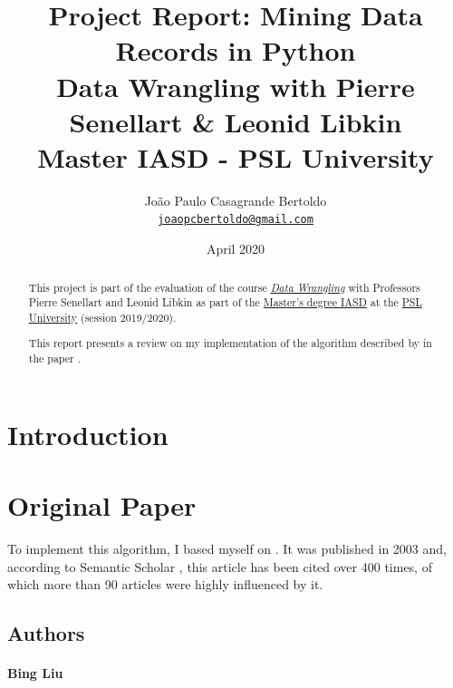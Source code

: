 \documentclass[10pt]{article}
\title{
    \huge Project Report: Mining Data Records in Python \\ 
    \medskip
    \large Data Wrangling with Pierre Senellart \& Leonid Libkin  \\
    Master IASD - PSL University
}
\author{
    João Paulo Casagrande Bertoldo \\
    \href{mailto:joaopcbertoldo@gmail.com}{\texttt{joaopcbertoldo@gmail.com}} 
}
\date{April 2020}
\begin{document}




{
    \maketitle

    \begin{abstract}
    
    This project is part of the evaluation of the course \href{https://moodle.di.ens.fr/enrol/index.php?id=14}{\textit{Data Wrangling}} with Professors Pierre Senellart and Leonid Libkin as part of the \href{https://www.lamsade.dauphine.fr/wp/iasd/en/}{Master's degree IASD} at the \href{https://www.psl.eu/en}{PSL University} (session 2019/2020).
    \medskip
    
    This report presents a review on my implementation of the algorithm described by \cite{mdr} in the paper . 

    \end{abstract}
}

\tableofcontents
\newpage


\section{Introduction}


\section{Original Paper}

To implement this algorithm, I based myself on \cite{mdr-technical}. It was published in 2003 and, according to Semantic Scholar \citep{mdr-semantic-scholar}, this article has been cited over 400 times, of which more than 90 articles were highly influenced by it.

\subsection{Authors}

\paragraph{Bing Liu}
\end{document}
